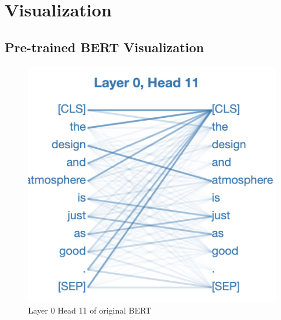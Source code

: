 \documentclass[fyp]{socreport}
\begin{document}















\section{Visualization}
\subsection{Pre-trained BERT Visualization}


\begin{figure}[h]
    \centering
    \includegraphics[width=\linewidth]{./image/L0H11.png}
    \caption{Layer 0 Head 11 of original BERT}
  \label{Framework}
\end{figure}
\end{document}
